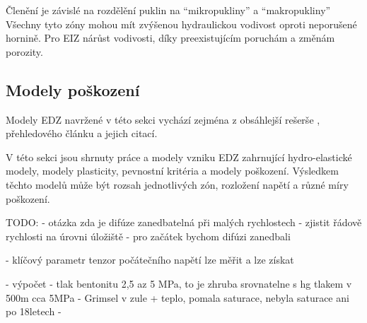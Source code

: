 \documentclass{article}
\begin{document}
Členění je závislé na rozdělění puklin na ``mikropukliny'' a ``makropukliny''
Všechny tyto zóny mohou mít zvýšenou hydraulickou vodivost oproti neporušené hornině. Pro EIZ nárůst vodivosti, díky preexistujícím poruchám a změnám porozity.

\subsection{Modely poškození}
Modely EDZ navržené v této sekci vychází zejména z obsáhlejší rešerše , přehledového článku \cite{Shahbazi2020a} a jejich citací.


V této sekci jsou shrnuty práce a modely vzniku EDZ zahrnující hydro-elastické modely, modely plasticity, pevnostní kritéria a modely poškození. Výsledkem těchto modelů může být rozsah jednotlivých zón, rozložení napětí a různé míry poškození.



TODO:
- otázka zda je difúze zanedbatelná při malých rychlostech
- zjistit řádově rychlosti na úrovni úložiště
- pro začátek bychom difúzi zanedbali

- klíčový parametr tenzor počátečního napětí
  lze měřit a lze získat 

- výpočet 
- tlak bentonitu 2,5 az 5 MPa, to je zhruba srovnatelne s hg tlakem v 500m cca 5MPa
- Grimsel v zule + teplo, pomala saturace, nebyla saturace ani po 18letech
- 
\end{document}

